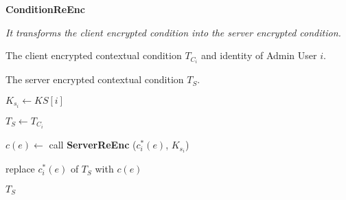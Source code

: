 \documentclass[epsfig,a4paper,11pt,titlepage]{book}
\numberwithin{algorithm}{chapter}
\newcommand{\algofontsize}{\fontsize{11}{12}\selectfont}
\begin{document}
\begin{algorithm} [htp]
{\algofontsize
\caption{\textbf{ConditionReEnc}}

\label{algo:erbac-deploy-contextual-condition-server-side}

\begin{algorithmic}[1]

\INPUT \emph{It transforms the client encrypted condition into the server encrypted condition.}

\Require The client encrypted contextual condition $T_{C_i}$ and identity of Admin User $i$.

\Ensure The server encrypted contextual condition $T_{S}$.

\medskip

\State $K_{s_i} \leftarrow KS[i]$ {\algofontsize {}} \label{line:erbac-deploy-cc-ss-ks}

\State $T_{S} \leftarrow T_{C_i}$ \label{line:erbac-deploy-cc-ss-copy}

 \label{line:erbac-deploy-cc-ss-loop}

	\State $c(e) \leftarrow$ call \textbf{ServerReEnc} ($c^*_i (e)$, $K_{s_i}$) \label{line:erbac-deploy-cc-ss-call}
	
	\State replace $c^*_i (e)$ of $T_{S}$ with $c(e)$ \label{line:erbac-deploy-cc-ss-replace}

\EndFor

\Return $T_{S}$

\end{algorithmic}
}
\end{algorithm}
\end{document}
